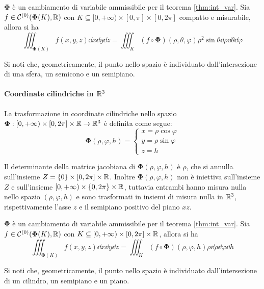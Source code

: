 $\bm\Phi$ è un cambiamento di variabile ammissibile per il teorema \ref{thm:int_var}. Sia $f \in \mathcal{C}^{(0)}(\bm\Phi(K),\mathbb{R})$ con $K\subseteq[0,+\infty)\times[0,\pi]\times[0,2\pi]$ compatto e misurabile, allora si ha
$$\iiint_{\bm\Phi(K)}f(x,y,z)\dd x \dd y \dd z=\iiint_K(f\circ\bm\Phi)(\rho,\theta,\varphi)\rho^2\sin\theta  \dd \rho \dd \theta \dd \varphi$$

Si noti che, geometricamente, il punto nello spazio è individuato dall'intersezione di una sfera, un semicono e un semipiano.

\paragraph{Coordinate cilindriche in $\mathbb{R}^3$}
La trasformazione in coordinate cilindriche nello spazio $\bm\Phi:[0,+\infty)\times[0,2\pi]\times\mathbb{R}\to\mathbb{R}^3$ è definita come segue:
$$
\bm\Phi(\rho,\varphi,h)=
\begin{cases}
    x=\rho\cos\varphi\\
    y=\rho\sin\varphi\\
    z=h
\end{cases}
$$

Il determinante della matrice jacobiana di $\bm\Phi(\rho,\varphi,h)$ è $\rho$, che si annulla sull'insieme $Z=\{0\}\times[0,2\pi]\times\mathbb{R}$. Inoltre $\bm\Phi(\rho,\varphi,h)$ non è iniettiva sull'insieme $Z$ e sull'insieme $[0,+\infty)\times\{0,2\pi\}\times\mathbb{R}$, tuttavia entrambi hanno misura nulla nello spazio $(\rho,\varphi,h)$ e sono trasformati in insiemi di misura nulla in $\mathbb{R}^3$, rispettivamente l'asse $z$ e il semipiano positivo del piano $xz$.

$\bm\Phi$ è un cambiamento di variabile ammissibile per il teorema \ref{thm:int_var}. Sia $f \in \mathcal{C}^{(0)}(\bm\Phi(K),\mathbb{R})$ con $K \subseteq [0,+\infty)\times[0,2\pi]\times\mathbb{R}$, allora si ha
$$\iiint_{\bm\Phi(K)}f(x,y,z)\dd x \dd y \dd z = \iiint_K (f\circ\bm\Phi)(\rho,\varphi,h)\rho \dd \rho \dd \varphi \dd h$$

Si noti che, geometricamente, il punto nello spazio è individuato dall'intersezione di un cilindro, un semipiano e un piano.